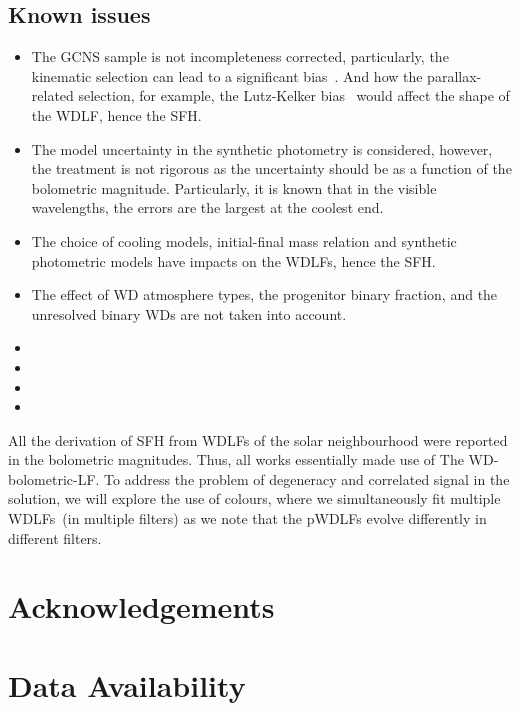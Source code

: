 \documentclass[fleqn,usenatbib]{mnras}
\begin{document}
\subsection{Known issues}
\begin{itemize}
    \item The GCNS sample is not incompleteness corrected, particularly, the
    kinematic selection can lead to a significant 
    bias~\citep{2015MNRAS.450.4098L}. And how the parallax-related selection,
    for example, the Lutz-Kelker bias~\citep{1973PASP...85..573L} would affect
    the shape of the WDLF, hence the SFH.
    \item The model uncertainty in the synthetic photometry is considered,
    however, the treatment is not rigorous as the uncertainty should be as
    a function of the bolometric magnitude. Particularly, it is known that
    in the visible wavelengths, the errors are the largest at the coolest end.
    \item The choice of cooling models, initial-final mass relation and
    synthetic photometric models have impacts on the WDLFs, hence the SFH.
    \item The effect of WD atmosphere types, the progenitor binary fraction,
    and the unresolved binary WDs are not taken into account.
    \item
    \item
    \item
    \item
\end{itemize}


All the derivation of SFH from WDLFs of the solar neighbourhood were reported
in the bolometric magnitudes. Thus, all works essentially made use of The
WD-bolometric-LF. To address the problem of degeneracy and correlated signal
in the solution, we will explore the use of colours, where we simultaneously
fit multiple WDLFs~(in multiple filters) as we note that the pWDLFs evolve
differently in different filters.

\section*{Acknowledgements}


\section*{Data Availability}
\end{document}

